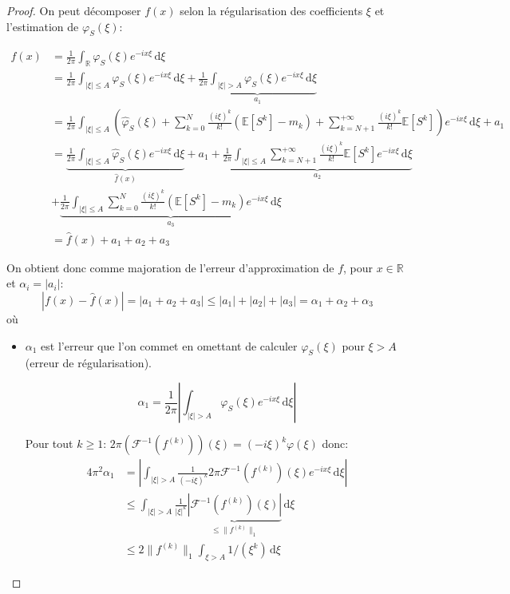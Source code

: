 \documentclass[12pt]{article}
\newcommand{\pth}[1]{\left(#1\right)}
\newcommand{\cro}[1]{\left[#1\right]}
\newcommand{\abs}[1]{\left|#1\right|}
\newcommand{\dabs}[1]{\|#1\|}
\newcommand{\de}{\,\mathrm{d}}
\newcommand{\Er}{\mathbb{R}}
\newcommand{\Esp}[1]{\mathbb{E}\cro{#1}}
\begin{document}
\begin{proof}
On peut décomposer $f(x)$ selon la régularisation des coefficients $\xi$ et l'estimation de $\varphi_S(\xi)$:

\begin{align*}
f(x) &= \frac1{2\pi} \int_{\mathbb R}\varphi_S(\xi)e^{-ix\xi}\de\xi\\
&= \frac1{2\pi} \int_{\abs{\xi}\leqslant A}\varphi_S(\xi)e^{-ix\xi}\de\xi + \underbrace{\frac1{2\pi} \int_{\abs{\xi} > A}\varphi_S(\xi)e^{-ix\xi}\de\xi}_{a_1}\\
&= \frac1{2\pi} \int_{\abs{\xi}\leqslant A}\pth{\hat{\varphi}_S(\xi)+\sum_{k=0}^{N}\frac{(i\xi)^k}{k!}\pth{\Esp{S^k}-m_k}+\sum_{k=N+1}^{+\infty}\frac{(i\xi)^k}{k!}\Esp{S^k}}e^{-ix\xi}\de\xi + a_1\\
&= \underbrace{\frac1{2\pi} \int_{\abs{\xi}\leqslant A}\hat{\varphi}_S(\xi)e^{-ix\xi}\de\xi}_{\hat f(x)}
+ a_1
+ \underbrace{\frac1{2\pi}\int_{\abs{\xi}\leqslant A}\sum_{k=N+1}^{+\infty}\frac{(i\xi)^k}{k!}\Esp{S^k}e^{-ix\xi}\de\xi}_{a_2}\\
&+ \underbrace{\frac1{2\pi}\int_{\abs{\xi}\leqslant A}\sum_{k=0}^{N}\frac{(i\xi)^k}{k!}\pth{\Esp{S^k}-m_k}e^{-ix\xi}\de\xi}_{a_3}\\
&= \hat{f}(x) + a_1 + a_2 + a_3
\end{align*}

On obtient donc comme majoration de l'erreur d'approximation de $f$, pour $x\in\Er$ et $\alpha_i = |a_i|$:
\[\abs{f(x)-\hat{f}(x)} = \abs{a_1 + a_2 + a_3}\leqslant |a_1| + |a_2| + |a_3| = \alpha_1+\alpha_2+\alpha_3\]
où

\begin{itemize}
\item $\alpha_1$ est l'erreur que l'on commet en omettant de calculer $\varphi_S(\xi)$ pour $\xi>A$ (erreur de régularisation). %

\[\alpha_1 = \frac1{2\pi} \abs{\int_{\abs{\xi} > A}\varphi_S(\xi)e^{-ix\xi}\de\xi}\]

  Pour tout $k\geqslant 1$: $2\pi\pth{\mathcal{F}^{-1}(f^{(k)})}(\xi)=(-i\xi)^k\varphi(\xi)$ donc:
  \begin{align*}
    4\pi^2\alpha_1&=\abs{\int_{\abs{\xi}>A}\frac{1}{(-i\xi)^k}2\pi\mathcal{F}^{-1}(f^{(k)})(\xi)e^{-ix\xi}\de\xi}\\
    &\leqslant \int_{\abs{\xi}>A}\frac{1}{\abs{\xi}^k}\underbrace{\abs{\mathcal{F}^{-1}(f^{(k)})(\xi)}}_{\leqslant\dabs{f^{(k)}}_{1}}\de\xi\\
    &\leqslant 2\dabs{f^{(k)}}_{1}\int_{\xi>A}1/(\xi^k)\de\xi
  \end{align*}


\end{itemize}
\end{proof}
\end{document}
